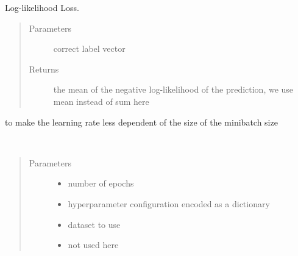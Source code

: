 \documentclass[letterpaper,10pt,english]{sphinxmanual}
\begin{document}
\begin{fulllineitems}

\begin{fulllineitems}
\label{\detokenize{index:classifiers.logistic.LogisticRegression.neg_log_likelihood}}
Log-likelihood Loss.
\begin{quote}\begin{description}
\item[{Parameters}] \leavevmode
{} \textendash{} correct label vector

\item[{Returns}] \leavevmode
the mean of the negative log-likelihood of the prediction, we use mean instead of sum here

\end{description}\end{quote}

to make the learning rate less dependent of the size of the minibatch size

\end{fulllineitems}


\begin{fulllineitems}
\label{\detokenize{index:classifiers.logistic.LogisticRegression.run_solver}}~\begin{quote}\begin{description}
\item[{Parameters}] \leavevmode\begin{itemize}
\item {} 
 \textendash{} number of epochs

\item {} 
 \textendash{} hyperparameter configuration encoded as a dictionary

\item {} 
 \textendash{} dataset to use

\item {} 
 \textendash{} not used here


\end{itemize}
\end{description}
\end{quote}
\end{fulllineitems}
\end{fulllineitems}
\end{document}

